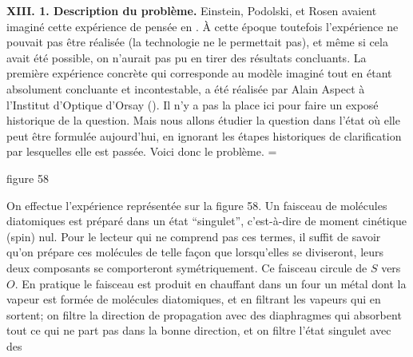 {\bf XIII. 1. Description du probl\`eme.}
\medskip
Einstein, Podolski, et Rosen avaient imagin\'e cette exp\'erience de 
pens\'ee en {} . \`A cette  
\'epoque toutefois l'exp\'erience ne pouvait pas \^etre r\'ealis\'ee (la 
technologie ne  le permettait pas), et m\^eme si cela avait \'et\'e 
possible, on n'aurait pas pu en tirer des r\'esultats  concluants. La 
premi\`ere exp\'erience concr\`ete qui corresponde au mod\`ele  
imagin\'e tout en \'etant  absolument  concluante et incontestable, a 
\'et\'e r\'ealis\'ee par Alain Aspect \`a l'Institut d'Optique d'Orsay 
({}). Il n'y a pas la place ici  pour faire un expos\'e 
historique de la question. 
Mais nous allons \'etudier la 
question dans  l'\'etat o\`u elle peut \^etre formul\'ee aujourd'hui, en 
ignorant les \'etapes historiques de clarification par lesquelles elle  
est pass\'ee. Voici donc le probl\`eme.    
\medskip 
\midinsert  
\epsfxsize=\hsize
{} 
\centerline{\eightpoint figure 58} 
\endinsert 
On effectue l'exp\'erience repr\'esent\'ee sur la figure 58. Un faisceau 
de mol\'ecules diatomiques est pr\'epar\'e dans un \'etat ``singulet'',
c'est-\`a-dire de moment cin\'etique (spin) nul. Pour le lecteur qui
ne comprend pas ces termes, il suffit de savoir qu'on pr\'epare ces 
mol\'ecules de telle fa\c{c}on que lorsqu'elles se diviseront, leurs deux
composants se comporteront sym\'etriquement. Ce faisceau circule de 
$S$ vers $O$. En pratique le faisceau est produit en chauffant dans un 
four un m\'etal dont la vapeur est form\'ee de mol\'ecules diatomiques,
et en filtrant les vapeurs qui en sortent; on filtre la
direction de propagation avec des diaphragmes qui absorbent tout ce qui
ne part pas dans la bonne direction, et on filtre l'\'etat singulet avec des
